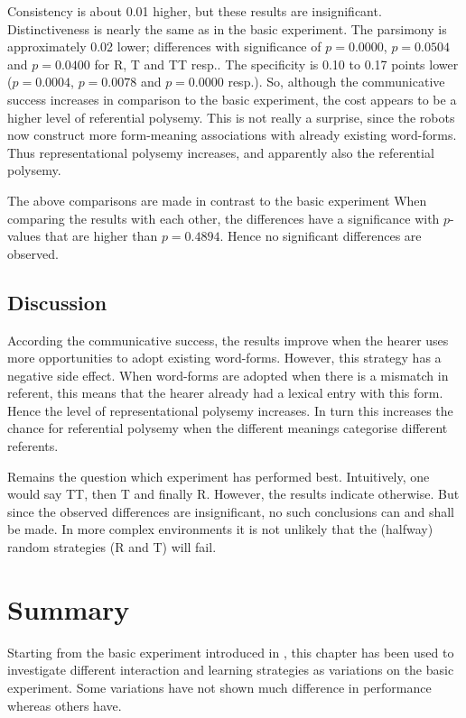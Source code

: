 Consistency is about 0.01 higher, but these results are insignificant. Distinctiveness is nearly the same as in the basic experiment. The parsimony is approximately 0.02 lower; differences with significance of $p=0.0000$, $p=0.0504$ and $p=0.0400$ for R, T and TT resp.. The specificity is 0.10 to 0.17 points lower ($p=0.0004$, $p=0.0078$ and $p=0.0000$ resp.). So, although the communicative success increases in comparison to the basic experiment, the cost appears to be a higher level of referential polysemy. This is not really a surprise, since the robots now construct more form-meaning associations with already existing word-forms. Thus representational polysemy increases, and apparently also the referential polysemy.

The above comparisons are made in contrast to the basic experiment When comparing the results with each other, the differences have a significance with $p$-values that are higher than $p=0.4894$. Hence no significant differences are observed.

\subsection{Discussion}

According the communicative success, the results improve when the hearer uses more opportunities to adopt existing word-forms. However, this strategy has a negative side effect. When word-forms are adopted when there is a mismatch in referent, this means that the hearer already had a lexical entry with this form. Hence the level of representational polysemy increases. In turn this increases the chance for referential polysemy when the different meanings categorise different referents.

Remains the question which experiment has performed best. Intuitively, one would say TT, then T and finally R. However, the results indicate otherwise. But since the observed differences are insignificant, no such conclusions can and shall be made. In more complex environments it is not unlikely that the (halfway) random strategies (R and T) will fail.


\section{Summary}

Starting from the basic experiment introduced in , this chapter has been used to investigate different interaction and learning strategies as variations on the basic experiment. Some variations have not shown much difference in performance whereas others have.


